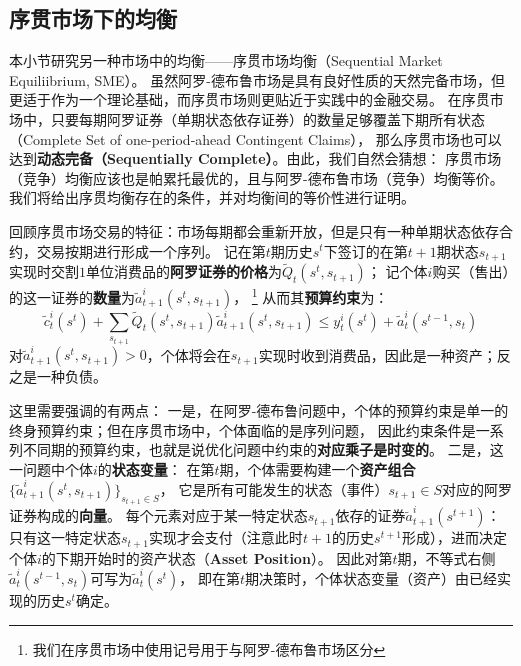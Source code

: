 \subsection{序贯市场下的均衡}

本小节研究另一种市场中的均衡——序贯市场均衡（Sequential Market Equiliibrium, SME）。
虽然阿罗-德布鲁市场是具有良好性质的天然完备市场，但更适于作为一个理论基础，而序贯市场则更贴近于实践中的金融交易。
在序贯市场中，只要每期阿罗证券（单期状态依存证券）的数量足够覆盖下期所有状态（Complete Set of one-period-ahead Contingent Claims），
那么序贯市场也可以达到\textbf{动态完备（Sequentially Complete）}。由此，我们自然会猜想：
序贯市场（竞争）均衡应该也是帕累托最优的，且与阿罗-德布鲁市场（竞争）均衡等价。我们将给出序贯均衡存在的条件，并对均衡间的等价性进行证明。

回顾序贯市场交易的特征：市场每期都会重新开放，但是只有一种单期状态依存合约，交易按期进行形成一个序列。
记在第$t$期历史$s^t$下签订的在第$t+1$期状态$s_{t+1}$实现时交割$1$单位消费品的\textbf{阿罗证券的价格}为$\tilde{Q}_t\left(s^t,s_{t+1}\right)$；
记个体$i$购买（售出）的这一证券的\textbf{数量}为$\tilde{a}_{t+1}^i\left(s^t,s_{t+1}\right)$，
\footnote{我们在序贯市场中使用$\tilde{}$记号用于与阿罗-德布鲁市场区分}
从而其\textbf{预算约束}为：
\begin{equation}    \label{eq-sq-bc}
    \tilde{c}_t^i\left(s^t\right)+\sum_{s_{t+1}} \tilde{Q}_t\left(s^t, s_{t+1}\right) \tilde{a}_{t+1}^i\left(s^t, s_{t+1}\right) 
        \leq y_t^i\left(s^t\right)+\tilde{a}_t^i\left(s^{t-1}, s_t\right)
\end{equation}
对$\tilde{a}_{t+1}^i\left(s^t,s_{t+1}\right)>0$，个体将会在$s_{t+1}$实现时收到消费品，因此是一种资产；反之是一种负债。

这里需要强调的有两点：
一是，在阿罗-德布鲁问题中，个体的预算约束是单一的终身预算约束；但在序贯市场中，个体面临的是序列问题，
因此约束条件是一系列不同期的预算约束，也就是说优化问题中约束的\textbf{对应乘子是时变的}。
二是，这一问题中个体$i$的\textbf{状态变量}：
在第$t$期，个体需要构建一个\textbf{资产组合}$\{\tilde{a}_{t+1}^i\left(s^t,s_{t+1}\right)\}_{s_{t+1}\in S}$，
它是所有可能发生的状态（事件）$s_{t+1}\in S$对应的阿罗证券构成的\textbf{向量}。
每个元素对应于某一特定状态$s_{t+1}$依存的证券$\tilde{a}_{t+1}^i\left(s^{t+1}\right)$：
只有这一特定状态$s_{t+1}$实现才会支付（注意此时$t+1$的历史$s^{t+1}$形成），进而决定个体$i$的下期开始时的资产状态（\textbf{Asset Position}）。
因此对第$t$期，不等式右侧$\tilde{a}_{t}^i\left(s^{t-1}, s_t\right)$可写为$\tilde{a}_t^i\left(s^t\right)$，
即在第$t$期决策时，个体状态变量（资产）由已经实现的历史$s^t$确定。

